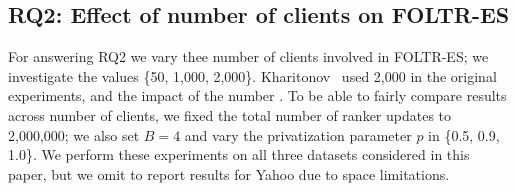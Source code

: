 %

\subsection{RQ2: Effect of number of clients on FOLTR-ES}

For answering RQ2 we vary thee number of clients involved in FOLTR-ES; we investigate the values \{50, 1,000, 2,000\}. Kharitonov~\cite{kharitonov2019federated} used 2,000 in the original experiments, and the impact of the number . To be able to fairly compare results across number of clients, we fixed the total number of ranker updates to 2,000,000; we also set $B = 4$ and vary the privatization parameter $p$ in \{0.5, 0.9, 1.0\}. We perform these experiments on all three datasets considered in this paper, but we omit to report results for Yahoo due to space limitations. 


